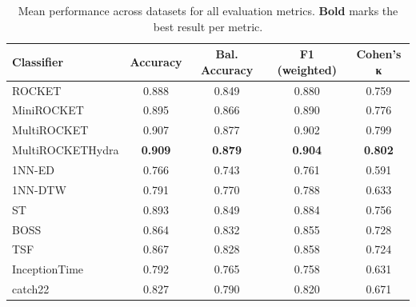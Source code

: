 \begin{table}[t]
\centering
\caption{Mean performance across datasets for all evaluation metrics. \textbf{Bold} marks the best result per metric.}
\label{tab:multi_metric}
\begin{tabular}{lcccc}
\toprule
Classifier & Accuracy & Bal. Accuracy & F1 (weighted) & Cohen's κ \\
\midrule
ROCKET & 0.888 & 0.849 & 0.880 & 0.759 \\
MiniROCKET & 0.895 & 0.866 & 0.890 & 0.776 \\
MultiROCKET & 0.907 & 0.877 & 0.902 & 0.799 \\
MultiROCKETHydra & \textbf{0.909} & \textbf{0.879} & \textbf{0.904} & \textbf{0.802} \\
1NN-ED & 0.766 & 0.743 & 0.761 & 0.591 \\
1NN-DTW & 0.791 & 0.770 & 0.788 & 0.633 \\
ST & 0.893 & 0.849 & 0.884 & 0.756 \\
BOSS & 0.864 & 0.832 & 0.855 & 0.728 \\
TSF & 0.867 & 0.828 & 0.858 & 0.724 \\
InceptionTime & 0.792 & 0.765 & 0.758 & 0.631 \\
catch22 & 0.827 & 0.790 & 0.820 & 0.671 \\
\bottomrule
\end{tabular}
\end{table}
